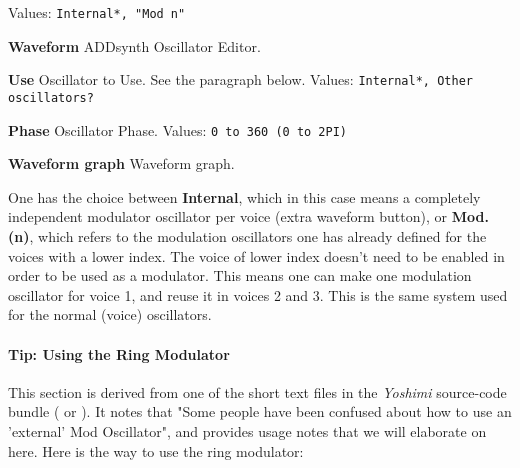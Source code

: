    Values: \texttt{Internal*, "Mod n"}

   \begin{enumber}
      \item \textbf{Waveform}
         ADDsynth Oscillator Editor.
      \item \textbf{Use}
         Oscillator to Use.
         See the paragraph below.
         Values: \texttt{Internal*, Other oscillators?}
      \item \textbf{Phase}
         Oscillator Phase.
         Values: \texttt{0 to 360 (0 to 2PI)}
      \item \textbf{Waveform graph}
         Waveform graph.
   \end{enumber}

   One has the choice between \textbf{Internal}, which in this case means a
   completely independent modulator oscillator per voice (extra waveform button),
   or \textbf{Mod. (n)}, which refers to the modulation oscillators one has
   already defined for the voices with a lower index.
   The voice of lower index doesn't need to be enabled in order to be used as a
   modulator. This means one can make one modulation oscillator for voice 1, and
   reuse it in voices 2 and 3.  This is the same system used for the normal (voice)
   oscillators.

\paragraph{Tip: Using the Ring Modulator}
\label{paragraph:tips_using_the_ring_modulator}

   This section is derived from one of the short text files in the
   \textsl{Yoshimi} source-code bundle (\cite{yoshimi} or \cite{yoshimi2}).
   It notes that "Some people have
   been confused about how to use an 'external' Mod Oscillator", and
   provides usage notes that we will elaborate on here.  Here is the way to
   use the ring modulator:

